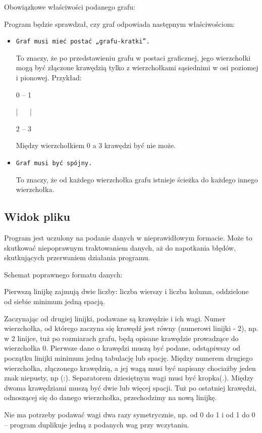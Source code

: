 \documentclass[]{article}
\begin{document}
Obowiązkowe właściwości podanego grafu:

Program będzie sprawdzał, czy graf odpowiada następnym właściwościom:
\begin{itemize}
    \item \texttt{Graf musi mieć postać „grafu-kratki”. }
    
To znaczy, że po przedstawieniu grafu w postaci graficznej, jego wierzchołki mogą być złączone krawędzią tylko z wierzchołkami sąsiednimi w osi poziomej i pionowej. Przykład:

0 – 1

|\, \, \, \,|

2 – 3  

Między wierzchołkiem 0 a 3 krawędzi być nie może.
    \item \texttt{Graf musi być spójny.}

To znaczy, że od każdego wierzchołka grafu istnieje ścieżka do każdego innego wierzchołka.

\end{itemize}

\subsection{Widok pliku}
Program jest uczulony na podanie danych w nieprawidłowym formacie. Może to skutkować niepoprawnym traktowaniem danych, aż do napotkania błędów, skutkujących przerwaniem działania programu. 

Schemat poprawnego formatu danych:

Pierwszą linijkę zajmują dwie liczby: liczba wierszy i liczba kolumn, oddzielone od siebie minimum jedną spacją.

Zaczynając od drugiej linijki, podawane są krawędzie i ich wagi. Numer wierzchołka, od którego zaczyna się krawędź jest równy (numerowi linijki - 2), np. w 2 linijce, tuż po rozmiarach grafu, będą opisane krawędzie prowadzące do wierzchołka 0. Pierwsze dane o krawędzi muszą być podane, odstąpiwszy od początku linijki minimum jedną tabulację lub spację. Między numerem drugiego wierzchołka, złączonego krawędzią, a jej wagą musi być napisany chociażby jeden znak niepusty, np (:). Separatorem dziesiętnym wagi musi być kropka(.). Między dwoma krawędziami muszą być dwie lub więcej spacji. Tuż po ostatniej krawędzi, odnoszącej się do danego wierzchołka, przechodzimy na nową linijkę.

Nie ma potrzeby podawać wagi dwa razy symetrycznie, np. od 0 do 1 i od 1 do 0 – program duplikuje jedną z podanych wag przy wczytaniu.
\end{document}
